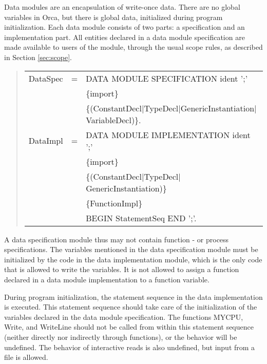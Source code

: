 \documentclass[10pt]{article}
\newenvironment{grammar}
{\begin{quote} \begin{tabular}{p{3.8cm} l l}}
{\end{tabular}\end{quote}}
\begin{document}
Data modules are an encapsulation of write-once data.
There are no global variables in Orca, but there is global data, initialized
during program initialization.
Each data module consists of two parts: a specification and
an implementation part.
All entities declared in a data module specification are made available
to users of the module, through the usual scope rules, as described in Section
\ref{sec:scope}.
\begin{grammar}
DataSpec & = & DATA MODULE SPECIFICATION ident ';' \\
& & \{import\} \\
& & \{(ConstantDecl$|$TypeDecl$|$GenericInstantiation$|$VariableDecl)\}. \\
DataImpl & = & DATA MODULE IMPLEMENTATION ident ';' \\
& & \{import\} \\
& & \{(ConstantDecl$|$TypeDecl$|$GenericInstantiation)\} \\
& & \{FunctionImpl\} \\
& & BEGIN StatementSeq END ';'.
\end{grammar}
A data specification module thus may not contain function - or process specifications.
The variables mentioned in the data specification module must be initialized by the code
in the data implementation module, which is the only code that is allowed to write
the variables.
It is not allowed to assign a function declared in a data module implementation
to a function variable.

During program initialization, the statement sequence in the data implementation
is executed.
This statement sequence should take care of the initialization of the variables
declared in the data module specification.
The functions MYCPU, Write, and WriteLine should not be called from
within this statement sequence (neither directly nor indirectly through functions),
or the behavior will be undefined.
The behavior of interactive reads is also undefined, but input from a file
is allowed.
\end{document}
